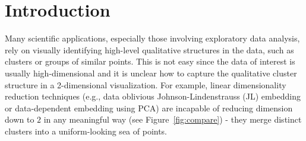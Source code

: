 
\section{Introduction}

 Many scientific applications, especially those involving exploratory data analysis, rely on visually identifying high-level 
 qualitative structures in the data, such as clusters or groups of similar points. This is not easy since the data of interest is usually high-dimensional and it is unclear how to capture the qualitative cluster structure in a 2-dimensional visualization. For example, linear dimensionality reduction techniques (e.g., data oblivious Johnson-Lindenstrauss (JL) embedding or data-dependent embedding using PCA) are incapable of reducing dimension down to $2$ in any meaningful way (see Figure~\ref{fig:compare}) - they merge distinct clusters into a uniform-looking sea of points.
 
